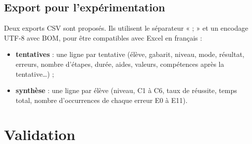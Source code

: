 \documentclass[11pt,a4paper]{report}
\begin{document}
\section{Export pour l'expérimentation}
Deux exports CSV sont proposés. Ils utilisent le séparateur « ; » et un encodage UTF-8 avec BOM, pour être compatibles avec Excel en français :
\begin{itemize}
  \item \textbf{tentatives} : une ligne par tentative (élève, gabarit, niveau, mode, résultat, erreurs, nombre d'étapes, durée, aides, valeurs, compétences après la tentative…) ;
  \item \textbf{synthèse} : une ligne par élève (niveau, C1 à C6, taux de réussite, temps total, nombre d'occurrences de chaque erreur E0 à E11).
\end{itemize}

\chapter{Validation}\label{ch:valid}
\end{document}
